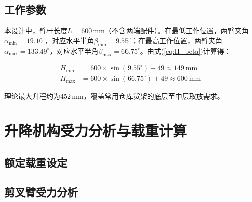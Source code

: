 {\subsection{工作参数}

本设计中，臂杆长度$L = 600$\,mm（不含两端配件）。在最低工作位置，两臂夹角$\alpha_{\min} = 19.10^{\circ}$，对应水平半角$\beta_{\min} = 9.55^{\circ}$；在最高工作位置，两臂夹角$\alpha_{\max} = 133.49^{\circ}$，对应水平半角$\beta_{\max} = 66.75^{\circ}$。由式(\ref{eq:H_beta})计算得：

\begin{align}
    H_{\min} &= 600 \times \sin(9.55^{\circ}) + 49 \approx 149\ \text{mm} \\
    H_{\max} &= 600 \times \sin(66.75^{\circ}) + 49 \approx 600\ \text{mm}
\end{align}

理论最大升程约为$452$\,mm，覆盖常用仓库货架的底层至中层取放需求。}

\section{升降机构受力分析与载重计算}

\subsection{额定载重设定}


\subsection{剪叉臂受力分析}

